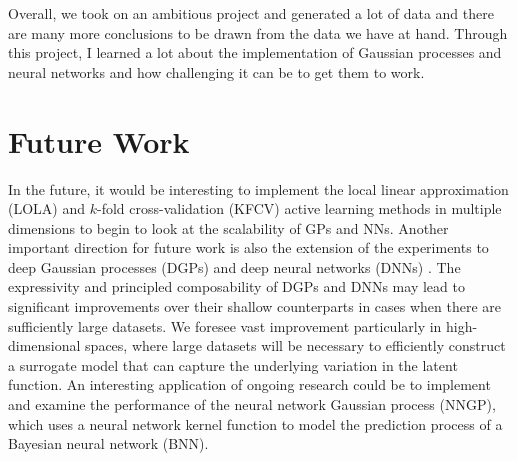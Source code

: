 \documentclass[conference,final]{IEEEtran}
\begin{document}
	Overall, we took on an ambitious project and generated a lot of data and there are many more conclusions to be drawn from the data we have at hand. Through this project, I learned a lot about the implementation of Gaussian processes and neural networks and how challenging it can be to get them to work.
	
	\section{Future Work}
	\label{sec:future-work}
	
	In the future, it would be interesting to implement the local linear approximation (LOLA) and $k$-fold cross-validation (KFCV) active learning methods in multiple dimensions to begin to look at the scalability of GPs and NNs. Another important direction for future work is also the extension of the experiments to deep Gaussian processes (DGPs) and deep neural networks (DNNs) \cite{Damianou2013DeepProcesses}. The expressivity and principled composability of DGPs and DNNs may lead to significant improvements over their shallow counterparts in cases when there are sufficiently large datasets. We foresee vast improvement particularly in high-dimensional spaces, where large datasets will be necessary to efficiently construct a surrogate model that can capture the underlying variation in the latent function. An interesting application of ongoing research could be to implement and examine the performance of the neural network Gaussian process (NNGP), which uses a neural network kernel function to model the prediction process of a Bayesian neural network (BNN).
	
	
	
	
	
\end{document}
